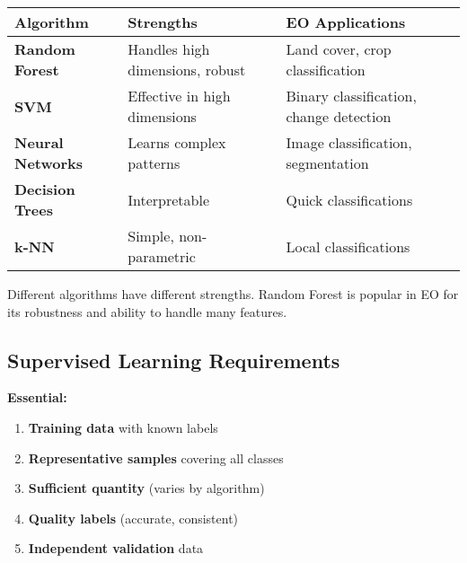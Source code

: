 \documentclass[
  letterpaper,
  DIV=11,
  numbers=noendperiod]{scrartcl}
\providecommand{\tightlist}{%
  \setlength{\itemsep}{0pt}\setlength{\parskip}{0pt}}
\begin{document}
\begin{longtable}[]{@{}
  >{\raggedright\arraybackslash}p{}
  >{\raggedright\arraybackslash}p{}
  >{\raggedright\arraybackslash}p{}@{}}
\toprule\noalign{}
\begin{minipage}[b]{\linewidth}\raggedright
\textbf{Algorithm}
\end{minipage} & \begin{minipage}[b]{\linewidth}\raggedright
\textbf{Strengths}
\end{minipage} & \begin{minipage}[b]{\linewidth}\raggedright
\textbf{EO Applications}
\end{minipage} \\
\midrule\noalign{}
\endhead
\bottomrule\noalign{}
\endlastfoot
\textbf{Random Forest} & Handles high dimensions, robust & Land cover,
crop classification \\
\textbf{SVM} & Effective in high dimensions & Binary classification,
change detection \\
\textbf{Neural Networks} & Learns complex patterns & Image
classification, segmentation \\
\textbf{Decision Trees} & Interpretable & Quick classifications \\
\textbf{k-NN} & Simple, non-parametric & Local classifications \\
\end{longtable}

Different algorithms have different strengths. Random Forest is popular
in EO for its robustness and ability to handle many features.

\subsection{Supervised Learning
Requirements}\label{supervised-learning-requirements}

\textbf{Essential:}

\begin{enumerate}
\def\labelenumi{\arabic{enumi}.}
\tightlist
\item
  \textbf{Training data} with known labels
\item
  \textbf{Representative samples} covering all classes
\item
  \textbf{Sufficient quantity} (varies by algorithm)
\item
  \textbf{Quality labels} (accurate, consistent)
\item
  \textbf{Independent validation} data
\end{enumerate}
\end{document}
